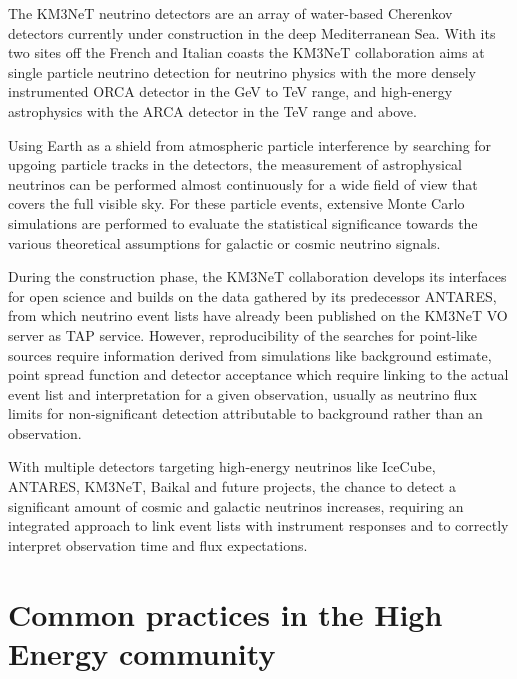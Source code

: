 \documentclass[11pt,a4paper]{ivoa}
\begin{document}
The KM3NeT neutrino detectors are an array of water-based Cherenkov detectors currently under construction in the deep Mediterranean Sea. With its two sites off the French and Italian coasts the KM3NeT collaboration aims at single particle neutrino detection for neutrino physics with the more densely instrumented ORCA detector in the GeV to TeV range, and high-energy astrophysics with the ARCA detector in the TeV range and above.

Using Earth as a shield from atmospheric particle interference by searching for upgoing particle tracks in the detectors, the measurement of astrophysical neutrinos can be performed almost continuously for a wide field of view that covers the full visible sky. For these particle events, extensive Monte Carlo simulations are performed to evaluate the statistical significance towards the various theoretical assumptions for galactic or cosmic neutrino signals.

During the construction phase, the KM3NeT collaboration develops its interfaces for open science and builds on the data gathered by its predecessor ANTARES, from which neutrino event lists have already been published on the KM3NeT VO server as TAP service. However, reproducibility of the searches for point-like sources require information derived from simulations like background estimate, point spread function and detector acceptance which require linking to the actual event list and interpretation for a given observation, usually as neutrino flux limits for non-significant detection attributable to background rather than an observation.

With multiple detectors targeting high-energy neutrinos like IceCube, ANTARES, KM3NeT, Baikal and future projects, the chance to detect a significant amount of cosmic and galactic neutrinos increases, requiring an integrated approach to link event lists with instrument responses and to correctly interpret observation time and flux expectations.







\section{Common practices in the High Energy community}
\end{document}
